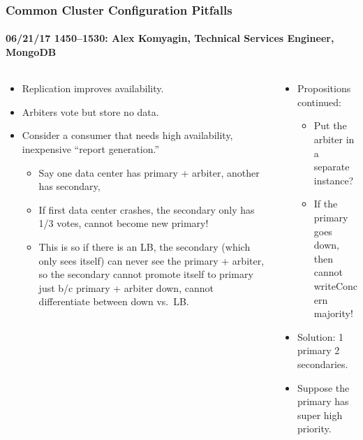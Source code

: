 \documentclass[xcolor=dvipsnames, 9pt]{beamer}
\begin{document}
\begin{frame}
    \frametitle{Common Cluster Configuration Pitfalls}
    \framesubtitle{%
        06/21/17 1450--1530:
        Alex Komyagin, Technical Services Engineer, MongoDB
    }
    \begin{columns}
        \begin{column}{0.5\textwidth}
            \begin{itemize}
                \item Replication improves availability.
                \item Arbiters vote but store no data.
                \item Consider a consumer that needs high availability,
                    inexpensive ``report generation.''
                    \begin{itemize}
                        \item Say one data center has primary + arbiter, another
                            has secondary,
                        \item If first data center crashes, the secondary only
                            has 1/3 votes, cannot become new primary!
                        \item This is so if there is an LB, the secondary (which
                            only sees itself) can never see the primary +
                            arbiter, so the secondary cannot promote itself to
                            primary just b/c primary + arbiter down, cannot
                            differentiate between down vs.\ LB.%
                    \end{itemize}
            \end{itemize}
        \end{column}
        \begin{column}{0.5\textwidth}
            \begin{itemize}
                \item Propositions continued:
                    \begin{itemize}
                        \item Put the arbiter in a separate instance?
                        \item If the primary goes down, then cannot writeConcern
                            majority!
                    \end{itemize}
                \item Solution: 1 primary 2 secondaries.
                \item Suppose the primary has super high priority.

\end{itemize}
\end{column}
\end{columns}
\end{frame}
\end{document}
